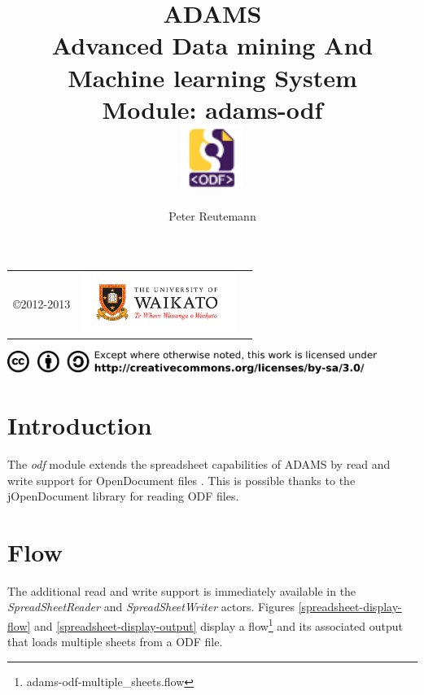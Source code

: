 \documentclass[a4paper]{book}
\title{
  \textbf{ADAMS} \\
  {\Large \textbf{A}dvanced \textbf{D}ata mining \textbf{A}nd \textbf{M}achine
  learning \textbf{S}ystem} \\
  {\Large Module: adams-odf} \\
  \vspace{1cm}
  \includegraphics[width=2cm]{images/odf-module.png} \\
}
\author{
  Peter Reutemann
}
\begin{document}
\begin{titlepage}
\maketitle

\thispagestyle{empty}
\center
\begin{table}[b]
	\begin{tabular}{c l l}
		\parbox[c][2cm]{2cm}{\copyright 2012-2013} &
		\parbox[c][2cm]{5cm}{\includegraphics[width=5cm]{images/coat_of_arms.pdf}} \\
	\end{tabular}
	\includegraphics[width=12cm]{images/cc.png} \\
\end{table}

\end{titlepage}

\tableofcontents
\listoffigures

\chapter{Introduction}
The \textit{odf} module extends the spreadsheet capabilities of ADAMS by read
and write support for OpenDocument files \cite{odf}. This is possible thanks 
to the jOpenDocument library \cite{jopendocument} for reading ODF files.

\chapter{Flow}
The additional read and write support is immediately available in the 
\textit{SpreadSheetReader} and \textit{SpreadSheetWriter} actors.
Figures \ref{spreadsheet-display-flow} and \ref{spreadsheet-display-output}
display a flow\footnote{adams-odf-multiple\_sheets.flow} and its associated
output that loads multiple sheets from a ODF file.
\end{document}
